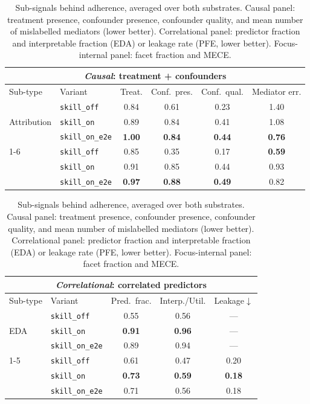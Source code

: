 \iffalse  %
\begin{table}[t]
\centering
\caption{Sub-signals behind adherence, averaged over both substrates. Causal panel: treatment presence, confounder presence, confounder quality, and mean number of mislabelled mediators (lower better). Correlational panel: predictor fraction and interpretable fraction (\textsf{EDA}) or leakage rate (\textsf{PFE}, lower better). Focus-internal panel: facet fraction and MECE.}
\label{tab:characteristic-signals}
\scriptsize
\setlength{\tabcolsep}{3pt}

\begin{tabular}{llcccc}
\multicolumn{6}{c}{\textit{Causal}: treatment + confounders} \\
\toprule
Sub-type & Variant & Treat. & Conf.\ pres. & Conf.\ qual. & Mediator err. \\
\midrule
\multirow{3}{*}{\textsf{Attribution}}
 & \texttt{skill\_off}     & 0.84 & 0.61 & 0.23 & 1.40 \\
 & \texttt{skill\_on}      & 0.89 & 0.84 & 0.41 & 1.08 \\
 & \texttt{skill\_on\_e2e} & \textbf{1.00} & \textbf{0.84} & \textbf{0.44} & \textbf{0.76} \\
\cmidrule(lr){1-6}
\multirow{3}{*}{\textsf{What-If}}
 & \texttt{skill\_off}     & 0.85 & 0.35 & 0.17 & \textbf{0.59} \\
 & \texttt{skill\_on}      & 0.91 & 0.85 & 0.44 & 0.93 \\
 & \texttt{skill\_on\_e2e} & \textbf{0.97} & \textbf{0.88} & \textbf{0.49} & 0.82 \\
\bottomrule
\end{tabular}

\vspace{4pt}

\begin{tabular}{llccc}
\multicolumn{5}{c}{\textit{Correlational}: correlated predictors} \\
\toprule
Sub-type & Variant & Pred.\ frac. & Interp./Util. & Leakage$\downarrow$ \\
\midrule
\multirow{3}{*}{\textsf{EDA}}
 & \texttt{skill\_off}     & 0.55 & 0.56 & --- \\
 & \texttt{skill\_on}      & \textbf{0.91} & \textbf{0.96} & --- \\
 & \texttt{skill\_on\_e2e} & 0.89 & 0.94 & --- \\
\cmidrule(lr){1-5}
\multirow{3}{*}{\textsf{PFE}}
 & \texttt{skill\_off}     & 0.61 & 0.47 & 0.20 \\
 & \texttt{skill\_on}      & \textbf{0.73} & \textbf{0.59} & \textbf{0.18} \\
 & \texttt{skill\_on\_e2e} & 0.71 & 0.56 & 0.18 \\
\bottomrule
\end{tabular}


\end{table}

